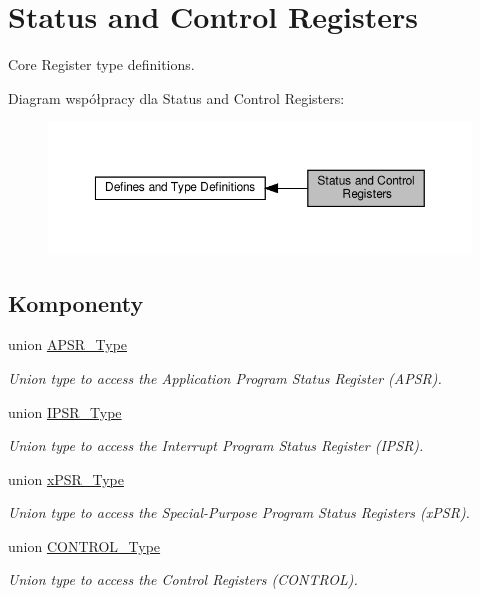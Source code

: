 \hypertarget{group___c_m_s_i_s___c_o_r_e}{}\section{Status and Control Registers}
\label{group___c_m_s_i_s___c_o_r_e}


Core Register type definitions.  


Diagram współpracy dla Status and Control Registers\+:\nopagebreak
\begin{figure}[H]
\begin{center}
\leavevmode
\includegraphics[width=350pt]{group___c_m_s_i_s___c_o_r_e}
\end{center}
\end{figure}
\subsection*{Komponenty}
\begin{DoxyCompactItemize}
\item 
union \hyperlink{union_a_p_s_r___type}{A\+P\+S\+R\+\_\+\+Type}
\begin{DoxyCompactList}\small\item\em Union type to access the Application Program Status Register (A\+P\+SR). \end{DoxyCompactList}\item 
union \hyperlink{union_i_p_s_r___type}{I\+P\+S\+R\+\_\+\+Type}
\begin{DoxyCompactList}\small\item\em Union type to access the Interrupt Program Status Register (I\+P\+SR). \end{DoxyCompactList}\item 
union \hyperlink{unionx_p_s_r___type}{x\+P\+S\+R\+\_\+\+Type}
\begin{DoxyCompactList}\small\item\em Union type to access the Special-\/\+Purpose Program Status Registers (x\+P\+SR). \end{DoxyCompactList}\item 
union \hyperlink{union_c_o_n_t_r_o_l___type}{C\+O\+N\+T\+R\+O\+L\+\_\+\+Type}
\begin{DoxyCompactList}\small\item\em Union type to access the Control Registers (C\+O\+N\+T\+R\+OL). \end{DoxyCompactList}\end{DoxyCompactItemize}
